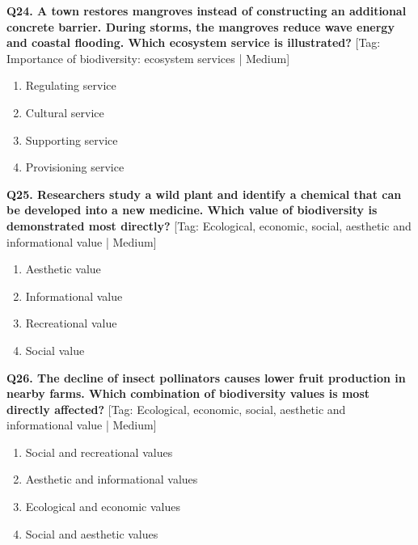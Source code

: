 \noindent\textbf{Q24. A town restores mangroves instead of constructing an additional concrete barrier. During storms, the mangroves reduce wave energy and coastal flooding. Which ecosystem service is illustrated?} \hfill [Tag: Importance of biodiversity: ecosystem services | Medium]
\begin{enumerate}[label=(\alph*),topsep=2pt,itemsep=1pt,partopsep=0pt,parsep=0pt]
    \item {Regulating service}
    \item {Cultural service}
    \item {Supporting service}
    \item {Provisioning service}
\end{enumerate}
\vspace{2mm}

\noindent\textbf{Q25. Researchers study a wild plant and identify a chemical that can be developed into a new medicine. Which value of biodiversity is demonstrated most directly?} \hfill [Tag: Ecological, economic, social, aesthetic and informational value | Medium]
\begin{enumerate}[label=(\alph*),topsep=2pt,itemsep=1pt,partopsep=0pt,parsep=0pt]
    \item {Aesthetic value}
    \item {Informational value}
    \item {Recreational value}
    \item {Social value}
\end{enumerate}
\vspace{2mm}

\noindent\textbf{Q26. The decline of insect pollinators causes lower fruit production in nearby farms. Which combination of biodiversity values is most directly affected?} \hfill [Tag: Ecological, economic, social, aesthetic and informational value | Medium]
\begin{enumerate}[label=(\alph*),topsep=2pt,itemsep=1pt,partopsep=0pt,parsep=0pt]
    \item {Social and recreational values}
    \item {Aesthetic and informational values}
    \item {Ecological and economic values}
    \item {Social and aesthetic values}
\end{enumerate}
\vspace{2mm}

